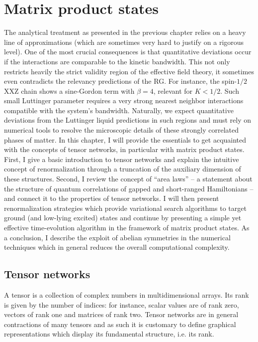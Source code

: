 \chapter{Matrix product states}
\label{sec:matrix_product_states}
The analytical treatment as presented in the previous chapter relies on a heavy line of approximations (which are sometimes very hard to justify on a rigorous level).
One of the most crucial consequences is that quantitative deviations occur if the interactions are comparable to the kinetic bandwidth.
This not only restricts heavily the strict validity region of the effective field theory, it sometimes even contradicts the relevancy predictions of the RG.
For instance, the spin-$1/2$ XXZ chain shows a sine-Gordon term with $\beta=4$, relevant for $K<1/2$.
Such small Luttinger parameter requires a very strong nearest neighbor interactions compatible with the system's bandwidth.
Naturally, we expect quantitative deviations from the Luttinger liquid predictions in such regions and must rely on numerical tools to resolve the microscopic details of these strongly correlated phases of matter.
In this chapter, I will provide the essentials to get acquainted with the concepts of tensor networks, in particular with matrix product states.
\\

First, I give a basic introduction to tensor networks and explain the intuitive concept of renormalization through a truncation of the auxiliary dimension of these structures.
Second, I review the concept of ``area laws'' -- a statement about the structure of quantum correlations of gapped and short-ranged Hamiltonians -- and connect it to the properties of tensor networks.
I will then present renormalization strategies which provide variational search algorithms to target ground (and low-lying excited) states and continue by presenting a simple yet effective time-evolution algorithm in the framework of matrix product states.
As a conclusion, I describe the exploit of abelian symmetries in the numerical techniques which in general reduces the overall computational complexity.
%
%
\section{Tensor networks}
\label{sec:tensor_networks}
A tensor is a collection of complex numbers in multidimensional arrays.
Its rank is given by the number of indices: for instance, scalar values are of rank zero, vectors of rank one and matrices of rank two.
Tensor networks are in general contractions of many tensors and as such it is customary to define graphical representations which display its fundamental structure, i.e. its rank.

